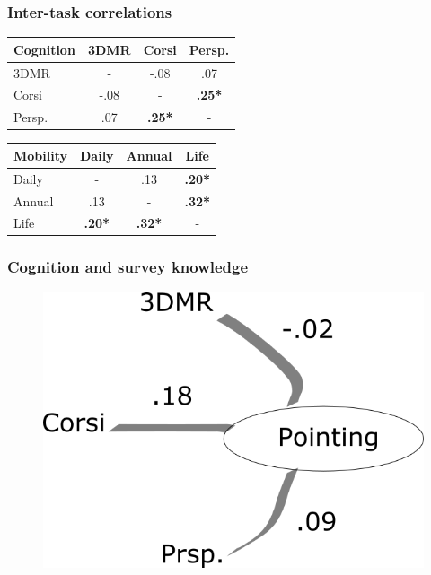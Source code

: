 \documentclass{beamer}
\begin{document}

\begin{frame}

\frametitle{Inter-task correlations}

\begin{table}
\begin{tabular}{l c c c}
\toprule
\textbf{Cognition} & 3DMR & Corsi & Persp.\\ 
\midrule
3DMR & - & -.08 & .07\\
Corsi & -.08 & - & \textbf{.25*}\\
Persp. & .07 & \textbf{.25*} & - \\
\bottomrule
\end{tabular}
\end{table}

\begin{table}
\begin{tabular}{l c c c}
\toprule
\textbf{Mobility} & Daily & Annual & Life\\ 
\midrule
Daily & - & .13 & \textbf{.20*}\\
Annual & .13 & - & \textbf{.32*}\\
Life & \textbf{.20*} & \textbf{.32*} & - \\
\bottomrule
\end{tabular}
\end{table}

\end{frame}


\begin{frame}
\frametitle{Cognition and survey knowledge}
\begin{figure}
\includegraphics[width=0.65\linewidth]{cognav}
\end{figure}
\end{frame}
\end{document}
